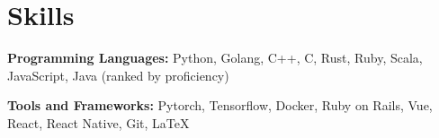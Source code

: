\documentclass{resume}
\begin{document}



\section{Skills}
\textbf{Programming Languages:} \small Python, Golang, C++, C, Rust, Ruby, Scala, JavaScript, Java (ranked by proficiency)

\textbf{Tools and Frameworks:} \small Pytorch, Tensorflow, Docker, Ruby on Rails, Vue, React, React Native, Git, \LaTeX
\end{document}
